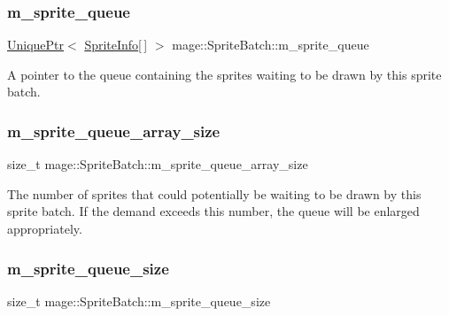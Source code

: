 \subsubsection{\texorpdfstring{m\+\_\+sprite\+\_\+queue}{m\_sprite\_queue}}
{\footnotesize\ttfamily \hyperlink{namespacemage_a3316d7143a973e37adf1110f2e80ca31}{Unique\+Ptr}$<$ \hyperlink{structmage_1_1_sprite_info}{Sprite\+Info}\mbox{[}$\,$\mbox{]} $>$ mage\+::\+Sprite\+Batch\+::m\+\_\+sprite\+\_\+queue\hspace{0.3cm}{\ttfamily [private]}}

A pointer to the queue containing the sprites waiting to be drawn by this sprite batch. \hypertarget{classmage_1_1_sprite_batch_a207760f2e11b1ea199529c65c9b21b3b}{}\label{classmage_1_1_sprite_batch_a207760f2e11b1ea199529c65c9b21b3b} 
\subsubsection{\texorpdfstring{m\+\_\+sprite\+\_\+queue\+\_\+array\+\_\+size}{m\_sprite\_queue\_array\_size}}
{\footnotesize\ttfamily size\+\_\+t mage\+::\+Sprite\+Batch\+::m\+\_\+sprite\+\_\+queue\+\_\+array\+\_\+size\hspace{0.3cm}{\ttfamily [private]}}

The number of sprites that could potentially be waiting to be drawn by this sprite batch. If the demand exceeds this number, the queue will be enlarged appropriately. \hypertarget{classmage_1_1_sprite_batch_a0d7dadf01e3b905072c1aaa6b8e42c0e}{}\label{classmage_1_1_sprite_batch_a0d7dadf01e3b905072c1aaa6b8e42c0e} 
\subsubsection{\texorpdfstring{m\+\_\+sprite\+\_\+queue\+\_\+size}{m\_sprite\_queue\_size}}
{\footnotesize\ttfamily size\+\_\+t mage\+::\+Sprite\+Batch\+::m\+\_\+sprite\+\_\+queue\+\_\+size\hspace{0.3cm}{\ttfamily [private]}}

